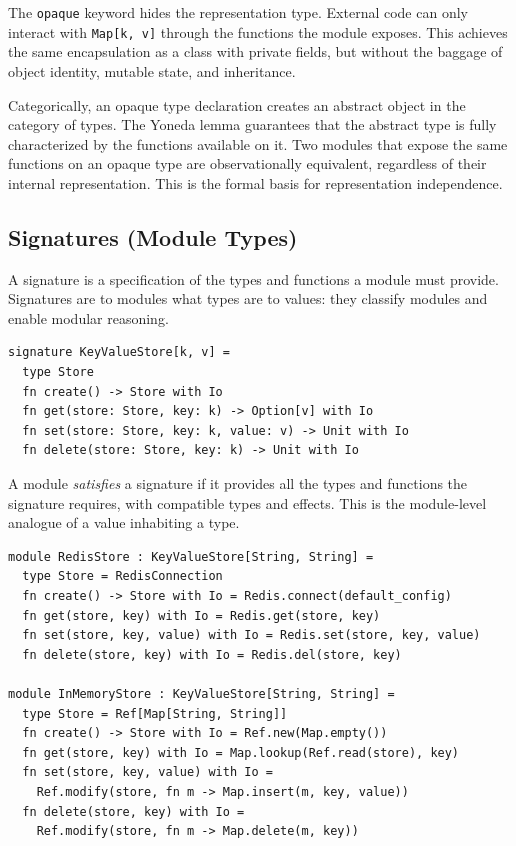 \documentclass[11pt,a4paper]{article}
\begin{document}
The \texttt{opaque} keyword hides the representation type. External code can only interact with \texttt{Map[k, v]} through the functions the module exposes. This achieves the same encapsulation as a class with private fields, but without the baggage of object identity, mutable state, and inheritance.

Categorically, an opaque type declaration creates an abstract object in the category of types. The Yoneda lemma guarantees that the abstract type is fully characterized by the functions available on it. Two modules that expose the same functions on an opaque type are observationally equivalent, regardless of their internal representation. This is the formal basis for representation independence.

\subsection{Signatures (Module Types)}

A signature is a specification of the types and functions a module must provide. Signatures are to modules what types are to values: they classify modules and enable modular reasoning.

\begin{lstlisting}
signature KeyValueStore[k, v] =
  type Store
  fn create() -> Store with Io
  fn get(store: Store, key: k) -> Option[v] with Io
  fn set(store: Store, key: k, value: v) -> Unit with Io
  fn delete(store: Store, key: k) -> Unit with Io
\end{lstlisting}

A module \emph{satisfies} a signature if it provides all the types and functions the signature requires, with compatible types and effects. This is the module-level analogue of a value inhabiting a type.

\begin{lstlisting}
module RedisStore : KeyValueStore[String, String] =
  type Store = RedisConnection
  fn create() -> Store with Io = Redis.connect(default_config)
  fn get(store, key) with Io = Redis.get(store, key)
  fn set(store, key, value) with Io = Redis.set(store, key, value)
  fn delete(store, key) with Io = Redis.del(store, key)

module InMemoryStore : KeyValueStore[String, String] =
  type Store = Ref[Map[String, String]]
  fn create() -> Store with Io = Ref.new(Map.empty())
  fn get(store, key) with Io = Map.lookup(Ref.read(store), key)
  fn set(store, key, value) with Io =
    Ref.modify(store, fn m -> Map.insert(m, key, value))
  fn delete(store, key) with Io =
    Ref.modify(store, fn m -> Map.delete(m, key))
\end{lstlisting}
\end{document}

